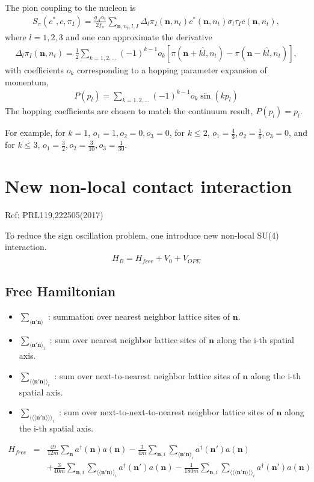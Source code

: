 \documentclass[10pt]{book}
\def\bm{\boldsymbol}
\newcommand{\bea}{\begin{eqnarray}}
\newcommand{\eea}{\end{eqnarray}}
\newcommand{\no}{\nonumber \\}
\def\vn{{\bm n}}
\def\la{\langle}
\def\ra{\rangle}
\begin{document}
The pion coupling to the nucleon is 
\bea 
S_{\pi}(c^*,c,\pi_I)=\frac{g_A\alpha_t}{2f_\pi}\sum_{\vn,n_t,l,I} \Delta_l \pi_I(\vn,n_t) c^*(\vn,n_t) \sigma_l \tau_I c(\vn,n_t),
\eea 
where $l=1,2,3$ and one can approximate the derivative
\bea 
\Delta_l \pi_I(\vn,n_t)=\frac{1}{2}\sum_{k=1,2,\dots} (-1)^{k-1} o_k 
  \left[  \pi(\vn+k\hat{l},n_t)- \pi(\vn-k\hat{l},n_t)\right], 
\eea 
with coefficients $o_k$ corresponding to a hopping parameter expansion of momentum,
\bea 
P(p_l)=\sum_{k=1,2,\dots}(-1)^{k-1} o_k \sin(k p_l)
\eea 
The hopping coefficients are chosen to match the continuum result, $P(p_l)=p_l$.

For example, for $k=1$, $o_1=1,o_2=0,o_3=0$,
for $k\leq 2$, $o_1=\frac{4}{3}, o_2=\frac{1}{6}, o_3=0$,
and for $k\leq 3$, $o_1=\frac{3}{2},o_2=\frac{3}{10},o_3=\frac{1}{30}$.

\section{New non-local contact interaction} 
Ref: PRL119,222505(2017)

To reduce the sign oscillation problem, one introduce new non-local SU(4) interaction. 
\bea 
H_B=H_{free}+V_0+V_{OPE}
\eea 

\subsection{Free Hamiltonian}
\begin{itemize}
	\item $\sum_{\la \vn'\vn\ra}$ : summation over nearest neighbor lattice sites of $\vn$.
	\item $\sum_{\la \vn'\vn\ra_i}$ : sum over nearest neighbor lattice sites of $\vn$ along the i-th spatial axis.
	\item $\sum_{\la\la \vn'\vn\ra\ra_i}$ : sum over next-to-nearest neighbor lattice sites of $\vn$ along the i-th spatial axis.
	\item $\sum_{\la\la\la \vn'\vn\ra\ra\ra_i}$ : sum over next-to-next-to-nearest neighbor lattice sites of $\vn$ along the i-th spatial axis.
\end{itemize}
\bea 
H_{free}&=&\frac{49}{12m}\sum_{\vn} a^\dagger(\vn) a(\vn)
    -\frac{3}{4m}\sum_{\vn,i}\sum_{\la \vn'\vn\ra_i} a^\dagger(\vn')a(\vn)
     \no & & 
    +\frac{3}{40m}\sum_{\vn,i}\sum_{\la\la \vn'\vn\ra\ra_i} a^\dagger(\vn')a(\vn)
    -\frac{1}{180m}\sum_{\vn,i}\sum_{\la\la\la \vn'\vn\ra\ra\ra_i} a^\dagger(\vn')a(\vn)
\eea 
\end{document}
